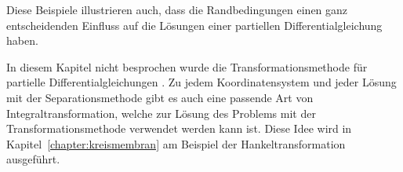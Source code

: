 Diese Beispiele illustrieren auch, dass die Randbedingungen einen
ganz entscheidenden Einfluss auf die Lösungen einer partiellen
Differentialgleichung haben.

In diesem Kapitel nicht besprochen wurde die Transformationsmethode
für partielle Differentialgleichungen \cite[chapter 5]{buch:partdiff}.
Zu jedem Koordinatensystem und jeder Lösung mit der Separationsmethode
gibt es auch eine passende Art von Integraltransformation, welche zur
Lösung des Problems mit der Transformationsmethode verwendet werden
kann ist.
Diese Idee wird in Kapitel~\ref{chapter:kreismembran}
am Beispiel der Hankeltransformation ausgeführt.




